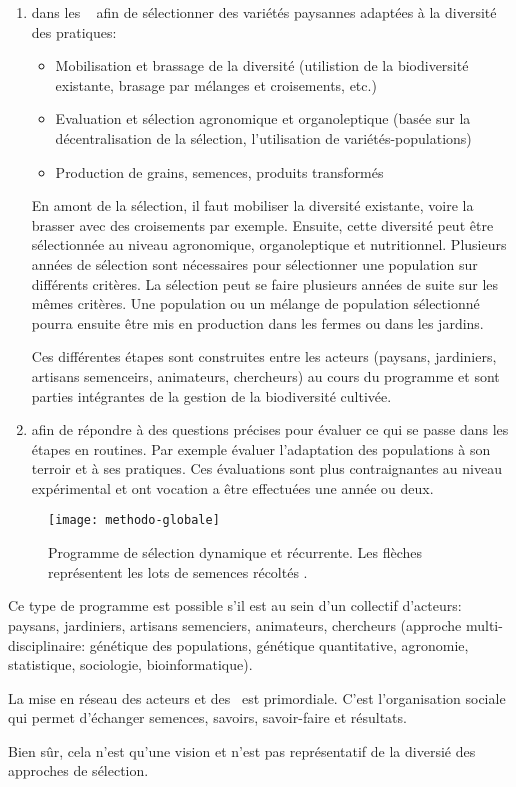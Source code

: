 \begin{enumerate}

\item {} dans les \MSPs~ afin de sélectionner des variétés paysannes adaptées à la diversité des pratiques:

\begin{itemize}
\item Mobilisation et brassage de la diversité (utilistion de la biodiversité existante, brasage par mélanges et croisements, etc.)
\item Evaluation et sélection agronomique et organoleptique (basée sur la décentralisation de la sélection, l'utilisation de variétés-populations)
\item Production de grains, semences, produits transformés
\end{itemize}

En amont de la sélection, il faut mobiliser la diversité existante, voire la brasser avec des croisements par exemple.
Ensuite, cette diversité peut être sélectionnée au niveau agronomique, organoleptique et nutritionnel. 
Plusieurs années de sélection sont nécessaires pour sélectionner une population sur différents critères.
La sélection peut se faire plusieurs années de suite sur les mêmes critères.
Une population ou un mélange de population sélectionné pourra ensuite être mis en production dans les fermes ou dans les jardins.

Ces différentes étapes sont construites entre les acteurs (paysans, jardiniers, artisans semenceirs, animateurs, chercheurs) au cours du programme et sont parties intégrantes de la gestion de la biodiversité cultivée.


\item {} afin de répondre à des questions précises pour évaluer ce qui se passe dans les étapes en routines.
Par exemple évaluer l'adaptation des populations à son terroir et à ses pratiques.
Ces évaluations sont plus contraignantes au niveau expérimental et ont vocation a être effectuées une année ou deux.

\end{enumerate}


\begin{figure}[H]
\centering\texttt{[image: methodo-globale]}
\caption{Programme de sélection dynamique et récurrente. Les flèches représentent les lots de semences récoltés \cite{methodo-globale}.}
\label{methodo-globale}
\end{figure}

Ce type de programme est possible s'il est  au sein d'un collectif d'acteurs: paysans, jardiniers, artisans semenciers, animateurs, chercheurs (approche multi-disciplinaire: génétique des populations, génétique quantitative, agronomie, statistique, sociologie, bioinformatique).

La mise en réseau des acteurs et des \MSPs~est primordiale. 
C'est l'organisation sociale qui permet d'échanger semences, savoirs, savoir-faire et résultats.

Bien sûr, cela n'est qu'une vision et n'est pas représentatif de la diversié des approches de sélection.
